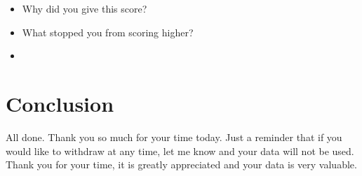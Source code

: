         \begin{itemize}
            \item Why did you give this score?
            \item What stopped you from scoring higher?
            \item         
        \end{itemize}


\section*{Conclusion}
    \begin{itshape}
        All done. Thank you so much for your time today. Just a reminder that if you would like to withdraw at any time, let me know and your data will not be used. Thank you for your time, it is greatly appreciated and your data is very valuable.
    \end{itshape}

